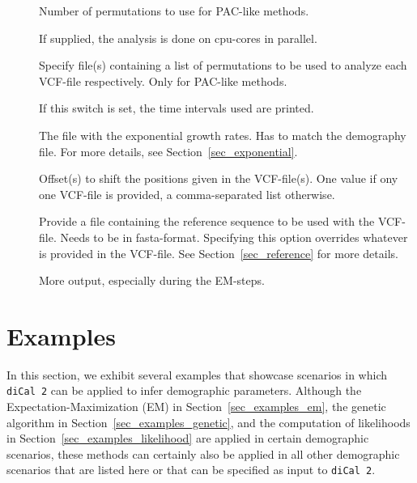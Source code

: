 \documentclass{article}
\numberwithin{equation}{section}
\begin{document}
\begin{description}
	\item[] Number of permutations to use for PAC-like methods.
	\item[] If supplied, the analysis is done on  cpu-cores in parallel.
	\item[] Specify file(s) containing a list of permutations to be used to analyze each VCF-file respectively. Only for PAC-like methods.
	\item[] If this switch is set, the time intervals used are printed.
	\item[] The file with the exponential growth rates. Has to match the demography file. For more details, see Section~\ref{sec_exponential}.
	\item[] Offset(s) to shift the positions given in the VCF-file(s). One value if ony one VCF-file is provided, a comma-separated list otherwise.
	\item[] Provide a file containing the reference sequence to be used with the VCF-file. Needs to be in fasta-format. Specifying this option overrides whatever is provided in the VCF-file. See Section~\ref{sec_reference} for more details.
	\item[] More output, especially during the EM-steps.
\end{description}   

\section{Examples}
\label{sec_examples}

In this section, we exhibit several examples that showcase scenarios in which \texttt{diCal 2} can be applied to infer demographic parameters. Although the Expectation-Maximization (EM) in Section~\ref{sec_examples_em}, the genetic algorithm in Section~\ref{sec_examples_genetic}, and the computation of likelihoods in Section~\ref{sec_examples_likelihood} are applied in certain demographic scenarios, these methods can certainly also be applied in all other demographic scenarios that are listed here or that can be specified as input to \texttt{diCal 2}.
\end{document}
